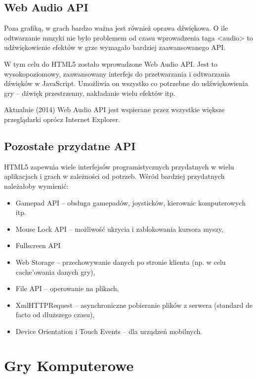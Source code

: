 \subsection{Web Audio API}
\label{ssec:webAudio}

Poza grafiką, w grach bardzo ważna jest również oprawa dźwiękowa. O ile odtwarzanie muzyki
nie było problemem od czasu wprowadzenia taga <audio> to udźwiękowienie efektów w grze
wymagało bardziej zaawansowanego API.

W tym celu do HTML5 zostało wprowadzone Web Audio API. Jest to wysokopoziomowy, zaawansowany
interfejs do przetwarzania i odtwarzania dźwięków w JavaScript. Umożliwia on wszystko co
potrzebne do udźwiękowienia gry -- dźwięk przestrzenny, nakładanie wielu efektów itp.

Aktualnie (2014) Web Audio API jest wspierane przez wszystkie większe przeglądarki oprócz
Internet Explorer.

\subsection{Pozostałe przydatne API}
\label{ssec:pozostaleApi}

HTML5 zapewnia wiele interfejsów programistycznych przydatnych w wielu aplikacjach
i grach w zależności od potrzeb. Wśród bardziej przydatnych należałoby wymienić:
\begin{itemize}
\item Gamepad API -- obsługa gamepadów, joysticków, kierownic komputerowych itp.
\item Mouse Lock API -- możliwość ukrycia i zablokowania kursora myszy,
\item Fullscreen API
\item Web Storage -- przechowywanie danych po stronie klienta (np. w celu cache'owania danych gry),
\item File API -- operowanie na plikach,
\item XmlHTTPRequest -- asynchroniczne pobieranie plików z serwera (standard de facto
  od dłuższego czasu),
\item Device Orientation i Touch Events -- dla urządzeń mobilnych.
\end{itemize}


\section{Gry Komputerowe}
\label{sec:gryKomputerowe}

